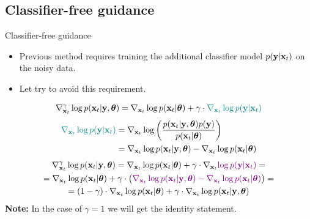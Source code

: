 \subsection{Classifier-free guidance}
\begin{frame}{Classifier-free guidance}
	\begin{itemize}
		\item Previous method requires training the additional classifier model $p(\mathbf{y} | \mathbf{x}_t)$ on the noisy data.	
		\item Let try to avoid this requirement.
	\end{itemize}
	\[
		\nabla_{\mathbf{x}_t}^{\gamma} \log p(\mathbf{x}_t | \mathbf{y}, \boldsymbol{\theta}) = \nabla_{\mathbf{x}_t} \log p(\mathbf{x}_t | \boldsymbol{\theta}) + \gamma \cdot {\color{teal}\nabla_{\mathbf{x}_t} \log p(\mathbf{y}| \mathbf{x}_t)}
	\]
	\vspace{-0.7cm}
	\begin{align*}
		{\color{teal}\nabla_{\mathbf{x}_t} \log p(\mathbf{y}| \mathbf{x}_t)} &= \nabla_{\mathbf{x}_t} \log \left( \frac{p(\mathbf{x}_t| \mathbf{y}, \boldsymbol{\theta}) p(\mathbf{y})}{p(\mathbf{x}_t | \boldsymbol{\theta})} \right) \\
		&=  \nabla_{\mathbf{x}_t} \log p(\mathbf{x}_t| \mathbf{y}, \boldsymbol{\theta}) -\nabla_{\mathbf{x}_t} \log  p(\mathbf{x}_t | \boldsymbol{\theta})
	\end{align*}
	\vspace{-0.8cm}
	\begin{multline*}
		\nabla_{\mathbf{x}_t}^{\gamma} \log p(\mathbf{x}_t | \mathbf{y}, \boldsymbol{\theta}) = \nabla_{\mathbf{x}_t} \log p(\mathbf{x}_t | \boldsymbol{\theta}) + \gamma \cdot \nabla_{\mathbf{x}_t} {\color{violet}\log p(\mathbf{y} | \mathbf{x}_t)} = \\
		= \nabla_{\mathbf{x}_t} \log p(\mathbf{x}_t | \boldsymbol{\theta}) + \gamma \cdot \bigl( {\color{violet}\nabla_{\mathbf{x}_t} \log p(\mathbf{x}_t| \mathbf{y}, \boldsymbol{\theta}) - \nabla_{\mathbf{x}_t} \log  p(\mathbf{x}_t | \boldsymbol{\theta})} \bigr) = \\
		=  (1 - \gamma) \cdot  \nabla_{\mathbf{x}_t} \log p(\mathbf{x}_t | \boldsymbol{\theta}) + \gamma \cdot  \nabla_{\mathbf{x}_t} \log p(\mathbf{x}_t| \mathbf{y}, \boldsymbol{\theta})
	\end{multline*}
	\textbf{Note:} In the case of $\gamma = 1$ we will get the identity statement.
\end{frame}
